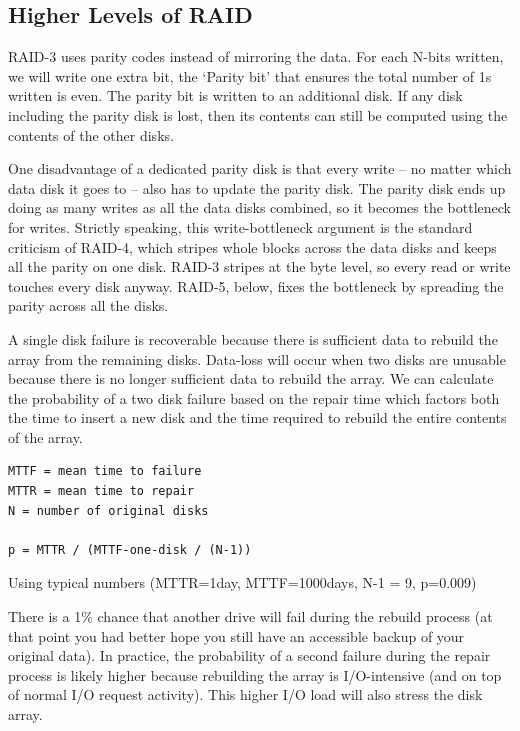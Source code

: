 \subsection{Higher Levels of RAID}

RAID-3 uses parity codes instead of mirroring the data.
For each N-bits written, we will write one extra bit, the `Parity bit' that ensures the total number of 1s written is even.
The parity bit is written to an additional disk.
If any disk including the parity disk is lost, then its contents can still be computed using the contents of the other disks.

One disadvantage of a dedicated parity disk is that every write -- no matter which data disk it goes to -- also has to update the parity disk.
The parity disk ends up doing as many writes as all the data disks combined, so it becomes the bottleneck for writes.
Strictly speaking, this write-bottleneck argument is the standard criticism of RAID-4, which stripes whole blocks across the data disks and keeps all the parity on one disk.
RAID-3 stripes at the byte level, so every read or write touches every disk anyway.
RAID-5, below, fixes the bottleneck by spreading the parity across all the disks.

A single disk failure is recoverable because there is sufficient data to rebuild the array from the remaining disks.
Data-loss will occur when two disks are unusable because there is no longer sufficient data to rebuild the array.
We can calculate the probability of a two disk failure based on the repair time which factors both the time to insert a new disk and the time required to rebuild the entire contents of the array.

\begin{verbatim}
MTTF = mean time to failure
MTTR = mean time to repair
N = number of original disks

p = MTTR / (MTTF-one-disk / (N-1))
\end{verbatim}

Using typical numbers (MTTR=1day, MTTF=1000days, N-1 = 9, p=0.009)

There is a 1\% chance that another drive will fail during the rebuild process (at that point you had better hope you still have an accessible backup of your original data).
In practice, the probability of a second failure during the repair process is likely higher because rebuilding the array is I/O-intensive (and on top of normal I/O request activity).
This higher I/O load will also stress the disk array.

